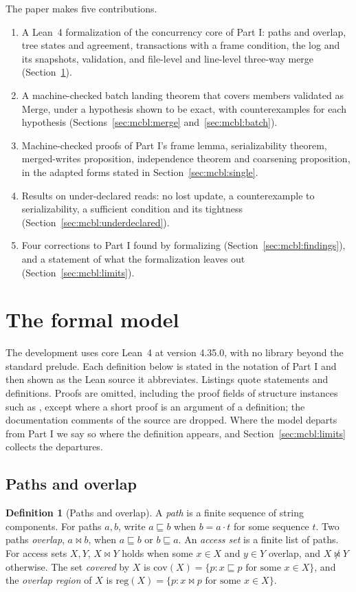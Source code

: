 \documentclass[11pt,letterpaper]{article}
\theoremstyle{definition}
\newtheorem{definition}[theorem]{Definition}
\theoremstyle{remark}
\newcommand{\meets}{\bowtie}
\newcommand{\nmeets}{\not\bowtie}
\newcommand{\cov}{\sqsubseteq}
\newcommand{\op}[1]{\mathrm{#1}}
\newcommand{\covd}{\op{cov}}
\newcommand{\reg}{\op{reg}}
\begin{document}
The paper makes five contributions.
\begin{enumerate}
\item A Lean~4 formalization of the concurrency core of Part I: paths and overlap, tree states and agreement, transactions with a frame condition, the log and its snapshots, validation, and file-level and line-level three-way merge (Section~\ref{sec:mcbl:model}).
\item A machine-checked batch landing theorem that covers members validated as Merge, under a hypothesis shown to be exact, with counterexamples for each hypothesis (Sections~\ref{sec:mcbl:merge} and~\ref{sec:mcbl:batch}).
\item Machine-checked proofs of Part I's frame lemma, serializability theorem, merged-writes proposition, independence theorem and coarsening proposition, in the adapted forms stated in Section~\ref{sec:mcbl:single}.
\item Results on under-declared reads: no lost update, a counterexample to serializability, a sufficient condition and its tightness (Section~\ref{sec:mcbl:underdeclared}).
\item Four corrections to Part I found by formalizing (Section~\ref{sec:mcbl:findings}), and a statement of what the formalization leaves out (Section~\ref{sec:mcbl:limits}).
\end{enumerate}

\section{The formal model}
\label{sec:mcbl:model}

The development uses core Lean~4 at version 4.35.0, with no library beyond the standard prelude. Each definition below is stated in the notation of Part I and then shown as the Lean source it abbreviates. Listings quote statements and definitions. Proofs are omitted, including the proof fields of structure instances such as , except where a short proof is an argument of a definition; the documentation comments of the source are dropped. Where the model departs from Part I we say so where the definition appears, and Section~\ref{sec:mcbl:limits} collects the departures.

\subsection{Paths and overlap}

\begin{definition}[Paths and overlap]
\label{def:mcbl:paths}
A \emph{path} is a finite sequence of string components. For paths $a,b$, write $a\cov b$ when $b=a\cdot t$ for some sequence $t$. Two paths \emph{overlap}, $a\meets b$, when $a\cov b$ or $b\cov a$. An \emph{access set} is a finite list of paths. For access sets $X,Y$, $X\meets Y$ holds when some $x\in X$ and $y\in Y$ overlap, and $X\nmeets Y$ otherwise. The set \emph{covered} by $X$ is $\covd(X)=\{p : x\cov p \text{ for some } x\in X\}$, and the \emph{overlap region} of $X$ is $\reg(X)=\{p : x\meets p \text{ for some } x\in X\}$.
\end{definition}
\end{document}
